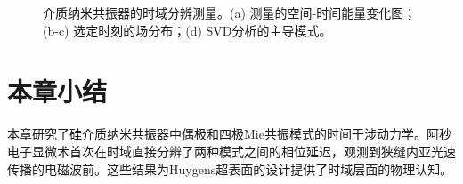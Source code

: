\begin{figure}[htbp]
    \centering
    \caption{\label{fig:ch5-multipolar} 介质纳米共振器的时域分辨测量。(a) 测量的空间-时间能量变化图；(b-c) 选定时刻的场分布；(d) SVD分析的主导模式。}
\end{figure}

\section{本章小结}
\label{sec:r2-summary}

本章研究了硅介质纳米共振器中偶极和四极Mie共振模式的时间干涉动力学。阿秒电子显微术首次在时域直接分辨了两种模式之间的相位延迟，观测到狭缝内亚光速传播的电磁波前。这些结果为Huygens超表面的设计提供了时域层面的物理认知。
